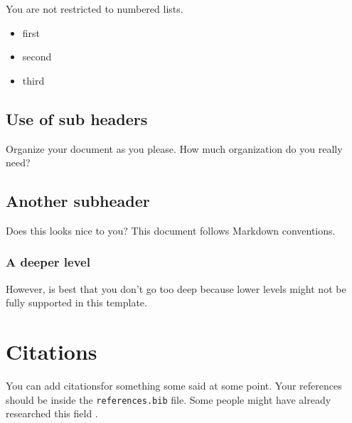 \documentclass[
  number,
  preprint,
  3p,
  twocolumn]{elsarticle}
\providecommand{\tightlist}{%
  \setlength{\itemsep}{0pt}\setlength{\parskip}{0pt}}\usepackage{longtable,booktabs,array}
\begin{document}
You are not restricted to numbered lists.

\begin{itemize}
\tightlist
\item
  first
\item
  second
\item
  third
\end{itemize}

\subsection{Use of sub headers}\label{use-of-sub-headers}

Organize your document as you please. How much organization do you
really need?

\subsection{Another subheader}\label{another-subheader}

Does this looks nice to you? This document follows Markdown conventions.

\subsubsection{A deeper level}\label{a-deeper-level}

However, is best that you don't go too deep because lower levels might
not be fully supported in this template.

\section{Citations}\label{citations}

You can add citationsfor something some said at some point. Your
references should be inside the \texttt{references.bib} file. Some
people might have already researched this field
\citep[see][pp.~1-2]{misc_online_news_popularity_332}.


\renewcommand\refname{References}
  
\end{document}
